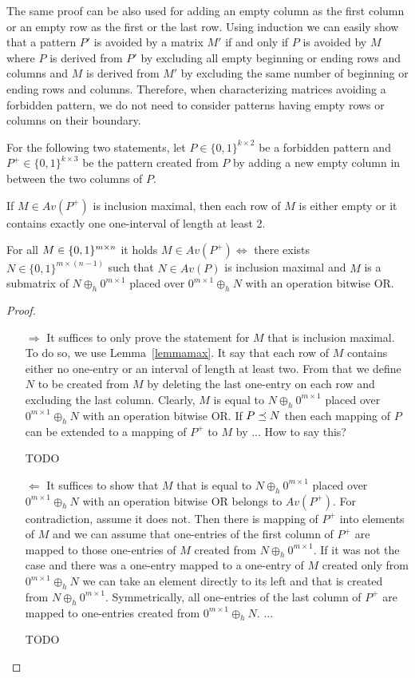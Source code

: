The same proof can be also used for adding an empty column as the first column or an empty row as the first or the last row. Using induction we can easily show that a pattern $P'$ is avoided by a matrix $M'$ if and only if $P$ is avoided by $M$ where $P$ is derived from $P'$ by excluding all empty beginning or ending rows and columns and $M$ is derived from $M'$ by excluding the same number of beginning or ending rows and columns. Therefore, when characterizing matrices avoiding a forbidden pattern, we do not need to consider patterns having empty rows or columns on their boundary.

For the following two statements, let $P\in\{0,1\}^{k\times2}$ be a forbidden pattern and $P^+\in\{0,1\}^{k\times3}$ be the pattern created from $P$ by adding a new empty column in between the two columns of $P$.

\begin{lemma}
\label{lemmamax}
If $M\in Av(P^+)$ is inclusion maximal, then each row of $M$ is either empty or it contains exactly one one-interval of length at least 2.
\end{lemma}

\begin{thm}
\label{emptymiddle}
For all $M\in\{0,1\}^{m\times n}$ it holds $M\in Av(P^+)\Leftrightarrow$ there exists $N\in\{0,1\}^{m\times(n-1)}$ such that $N\in Av(P)$ is inclusion maximal and $M$ is a submatrix of $N\oplus_h0^{m\times1}$ placed over $0^{m\times1}\oplus_hN$ with an operation bitwise OR.
\end{thm}
\begin{proof}
\begin{itemize}
\item[$\Rightarrow$] It suffices to only prove the statement for $M$ that is inclusion maximal. To do so, we use Lemma~\ref{lemmamax}. It say that each row of $M$ contains either no one-entry or an interval of length at least two. From that we define $N$ to be created from $M$ by deleting the last one-entry on each row and excluding the last column. Clearly, $M$ is equal to $N\oplus_h0^{m\times1}$ placed over $0^{m\times1}\oplus_hN$ with an operation bitwise OR. If $P\preceq N$ then each mapping of $P$ can be extended to a mapping of $P^+$ to $M$ by ... How to say this?

TODO
\item[$\Leftarrow$] It suffices to show that $M$ that is equal to $N\oplus_h0^{m\times1}$ placed over $0^{m\times1}\oplus_hN$ with an operation bitwise OR belongs to $Av(P^+)$. For contradiction, assume it does not. Then there is mapping of $P^+$ into elements of $M$ and we can assume that one-entries of the first column of $P^+$ are mapped to those one-entries of $M$ created from $N\oplus_h0^{m\times1}$. If it was not the case and there was a one-entry mapped to a one-entry of $M$ created only from $0^{m\times1}\oplus_hN$ we can take an element directly to its left and that is created from $N\oplus_h0^{m\times1}$. Symmetrically, all one-entries of the last column of $P^+$ are mapped to one-entries created from $0^{m\times1}\oplus_hN$. ...

TODO
\end{itemize}
\end{proof}

